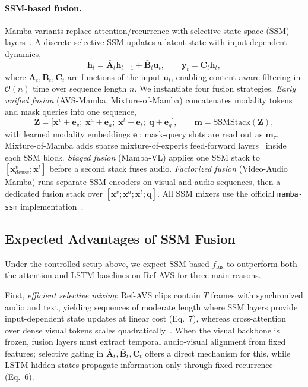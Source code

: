 \documentclass[a4paper,12pt]{extarticle}
\begin{document}
\paragraph{SSM-based fusion.}
Mamba variants replace attention/recurrence with selective state-space (SSM) layers~\cite{dao2024mamba, gu2021s4}. A discrete selective SSM updates a latent state with input-dependent dynamics,
\begin{equation}
    \mathbf{h}_t = \bar{\mathbf{A}}_t \mathbf{h}_{t-1} + \bar{\mathbf{B}}_t \mathbf{u}_t, \qquad
    \mathbf{y}_t = \mathbf{C}_t \mathbf{h}_t,
\end{equation}
where $\bar{\mathbf{A}}_t, \bar{\mathbf{B}}_t, \mathbf{C}_t$ are functions of the input $\mathbf{u}_t$, enabling content-aware filtering in $\mathcal{O}(n)$ time over sequence length $n$. We instantiate four fusion strategies. \emph{Early unified fusion} (AVS-Mamba, Mixture-of-Mamba) concatenates modality tokens and mask queries into one sequence,
\begin{equation}
    \mathbf{Z} = \big[\mathbf{x}^{v} + \mathbf{e}_v;\; \mathbf{x}^{a} + \mathbf{e}_a;\; \mathbf{x}^{t} + \mathbf{e}_t;\; \mathbf{q} + \mathbf{e}_q\big],
    \qquad \mathbf{m} = \mathrm{SSMStack}(\mathbf{Z}),
\end{equation}
with learned modality embeddings $\mathbf{e}_\cdot$; mask-query slots are read out as $\mathbf{m}_\tau$. Mixture-of-Mamba adds sparse mixture-of-experts feed-forward layers~\cite{mixturemamba2025, shazeer2017outrageously} inside each SSM block. \emph{Staged fusion} (Mamba-VL) applies one SSM stack to $[\mathbf{x}^{v}_{\mathrm{dense}}; \mathbf{x}^{t}]$ before a second stack fuses audio. \emph{Factorized fusion} (Video-Audio Mamba) runs separate SSM encoders on visual and audio sequences, then a dedicated fusion stack over $[\mathbf{x}^{v}; \mathbf{x}^{a}; \mathbf{x}^{t}; \mathbf{q}]$. All SSM mixers use the official \texttt{mamba-ssm} implementation~\cite{mambassm2024}.

\subsection{Expected Advantages of SSM Fusion}

Under the controlled setup above, we expect SSM-based $f_{\mathrm{fus}}$ to outperform both the attention and LSTM baselines on Ref-AVS for three main reasons.

First, \emph{efficient selective mixing}: Ref-AVS clips contain $T$ frames with synchronized audio and text, yielding sequences of moderate length where SSM layers provide input-dependent state updates at linear cost (Eq.~7), whereas cross-attention over dense visual tokens scales quadratically~\cite{tay2020efficient, dao2024mamba}. When the visual backbone is frozen, fusion layers must extract temporal audio-visual alignment from fixed features; selective gating in $\bar{\mathbf{A}}_t, \bar{\mathbf{B}}_t, \mathbf{C}_t$ offers a direct mechanism for this, while LSTM hidden states propagate information only through fixed recurrence (Eq.~6).
\end{document}

